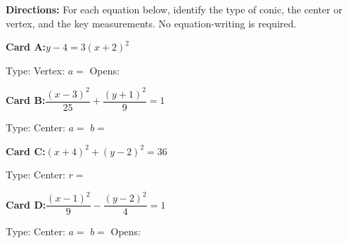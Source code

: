 \documentclass[10pt]{article}
\begin{document}
\namepartnerperiod

\vspace{0.10in}

\begin{tcolorbox}[colback=white, colframe=black!40,
    title=\textbf{Tier R --- Remediate},
    fonttitle=\bfseries, arc=2mm, left=3mm, right=3mm, top=2mm, bottom=2mm]

\textbf{Directions:} For each equation below, identify the type of conic,
the center or vertex, and the key measurements. No equation-writing is required.

\vspace{6pt}
\textbf{Card A:}\quad $y - 4 = 3(x + 2)^2$

Type: \blank{2.5cm} \quad Vertex: \blank{3cm} \quad $a =$ \blank{1.5cm} \quad Opens: \blank{2cm}

\vspace{10pt}
\textbf{Card B:}\quad $\dfrac{(x-3)^2}{25} + \dfrac{(y+1)^2}{9} = 1$

Type: \blank{2.5cm} \quad Center: \blank{3cm} \quad $a =$ \blank{1.5cm} \quad $b =$ \blank{1.5cm}

\vspace{10pt}
\textbf{Card C:}\quad $(x+4)^2 + (y-2)^2 = 36$

Type: \blank{2.5cm} \quad Center: \blank{3cm} \quad $r =$ \blank{1.5cm}

\vspace{10pt}
\textbf{Card D:}\quad $\dfrac{(x-1)^2}{9} - \dfrac{(y-2)^2}{4} = 1$

Type: \blank{2.5cm} \quad Center: \blank{3cm} \quad $a =$ \blank{1.5cm} \quad $b =$ \blank{1.5cm} \quad Opens: \blank{2cm}

\end{tcolorbox}

\vspace{0.10in}
\end{document}
